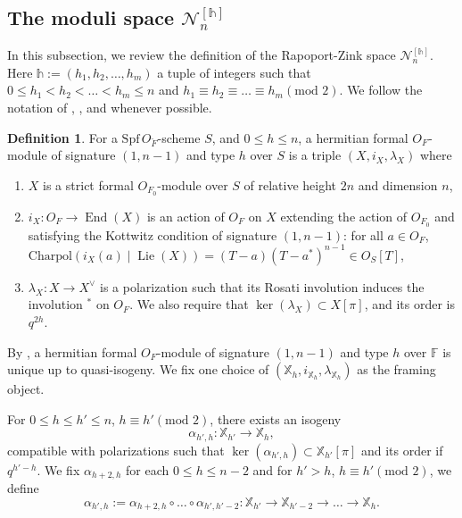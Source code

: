 \documentclass[11pt,oneside]{amsart}
\DeclareMathOperator{\End}{End}
\DeclareMathOperator{\Lie}{Lie}
\theoremstyle{plain}
\theoremstyle{definition}
\newtheorem{definition}[theorem]{Definition}
\theoremstyle{remark}
\newcommand{\tx}[1]{\text{#1}}
\newcommand{\BF}{{\mathbb F}}
\newcommand{\BX}{{\mathbb X}}
\newcommand{\CN}{{\mathcal N}}
\newcommand{\Spf}{\mathrm{Spf}\, }
\numberwithin{equation}{section}
\begin{document}
	\subsection{The moduli space $\CN^{[\mathds{h}]}_{n}$}
	In this subsection, we review the definition of the Rapoport-Zink space $\CN_n^{[\mathds{h}]}$. Here $\mathds{h}:=(h_1,h_2,\dots,h_m)$ a tuple of integers such that $0\leq h_1<h_2<\dots<h_m \leq n$ and $h_1 \equiv h_2 \equiv \dots \equiv h_m (\tx{mod } 2)$. We follow the notation of \cite{RZ}, \cite{LRZ}, and \cite{Muller} whenever possible.
	\begin{definition}
		For a $\Spf O_{\breve{F}}$-scheme $S$, and $0 \leq h \leq n$, a hermitian formal $O_F$-module of signature $(1,n-1)$ and type $h$ over $S$ is a triple $(X,i_X,\lambda_X)$ where
		\begin{enumerate}
			\item $X$ is a strict formal $O_{F_0}$-module over $S$ of relative height $2n$ and dimension $n$,
			
			\item $i_X:O_F \rightarrow \End(X)$ is an action of $O_F$ on $X$ extending the action of $O_{F_0}$ and satisfying the Kottwitz condition of signature $(1,n-1)$:
			for all $a \in O_F$, $\tx{Charpol}(i_{X}(a)\mid \Lie(X))=(T-a)(T-a^*)^{n-1} \in O_S[T]$,
			
			\item $\lambda_X :X \rightarrow X^{\vee}$ is a polarization such that its Rosati involution induces the involution $^*$ on $O_F$. We also require that $\ker(\lambda_X) \subset X[\pi]$, and its order is $q^{2h}$.
		\end{enumerate}
	\end{definition}
	
	By \cite[Remark 3.32]{cho2018basic}, a hermitian formal $O_F$-module of signature $(1,n-1)$ and type $h$ over $\BF$ is unique up to quasi-isogeny. We fix one choice of $(\BX_h,i_{\BX_h},\lambda_{\BX_h})$ as the framing object.
	
	For $0 \leq h \leq h' \leq n$, $h \equiv h' (\tx{mod }2)$, there exists an isogeny
	\begin{equation*}
		\alpha_{h',h}:\BX_{h'} \rightarrow \BX_{h},
	\end{equation*}
	compatible with polarizations such that $\ker (\alpha_{h',h}) \subset \BX_{h'}[\pi]$ and its order if $q^{h'-h}$. We fix $\alpha_{h+2,h}$ for each $0 \leq h \leq n-2$ and for $h'>h$, $h \equiv h' (\tx{mod }2)$, we define
	\begin{equation*}
		\alpha_{h',h}:=\alpha_{h+2,h}\circ \dots \circ \alpha_{h',h'-2}:\BX_{h'} \rightarrow \BX_{h'-2} \rightarrow \dots \rightarrow \BX_{h}.
	\end{equation*}
	
\end{document}
